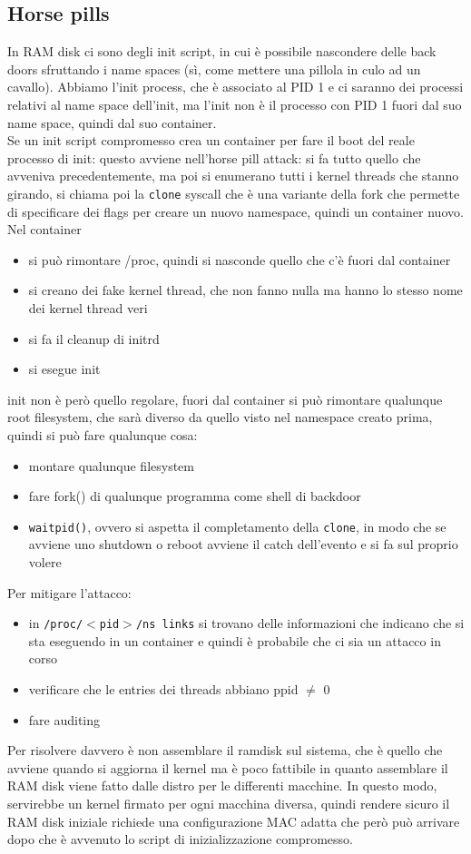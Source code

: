\documentclass[12pt, oneside]{extbook} %
\begin{document}
\subsection{Horse pills}
In RAM disk ci sono degli init script, in cui è possibile nascondere delle back doors sfruttando i name spaces (sì, come mettere una pillola in culo ad un cavallo). Abbiamo l'init process, che è associato al PID 1 e ci saranno dei processi relativi al name space dell'init, ma l'init non è il processo con PID 1 fuori dal suo name space, quindi dal suo container.\\Se un init script compromesso crea un container per fare il boot del reale processo di init: questo avviene nell'horse pill attack: si fa tutto quello che avveniva precedentemente, ma poi si enumerano tutti i kernel threads che stanno girando, si chiama poi la \texttt{clone} syscall che è una variante della fork che permette di specificare dei flags per creare un nuovo namespace, quindi un container nuovo. Nel container
\begin{itemize}
\item si può rimontare /proc, quindi si nasconde quello che c'è fuori dal container
\item si creano dei fake kernel thread, che non fanno nulla ma hanno lo stesso nome dei kernel thread veri
\item si fa il cleanup di initrd
\item si esegue init
\end{itemize}
init non è però quello regolare, fuori dal container si può rimontare qualunque root filesystem, che sarà diverso da quello visto nel namespace creato prima, quindi si può fare qualunque cosa:
\begin{itemize}
\item montare qualunque filesystem
\item fare fork() di qualunque programma come shell di backdoor
\item \texttt{waitpid()}, ovvero si aspetta il completamento della \texttt{clone}, in modo che se avviene uno shutdown o reboot avviene il catch dell'evento e si fa sul proprio volere
\end{itemize}
Per mitigare l'attacco:
\begin{itemize}
\item in \texttt{/proc/$<$pid$>$/ns links} si trovano delle informazioni che indicano che si sta eseguendo in un container e quindi è probabile che ci sia un attacco in corso
\item verificare che le entries dei threads abbiano ppid $\neq$ 0
\item fare auditing
\end{itemize}
Per risolvere davvero è non assemblare il ramdisk sul sistema, che è quello che avviene quando si aggiorna il kernel ma è poco fattibile in quanto assemblare il RAM disk viene fatto dalle distro per le differenti macchine. In questo modo, servirebbe un kernel firmato per ogni macchina diversa, quindi rendere sicuro il RAM disk iniziale richiede una configurazione MAC adatta che però può arrivare dopo che è avvenuto lo script di inizializzazione compromesso.
\end{document}
